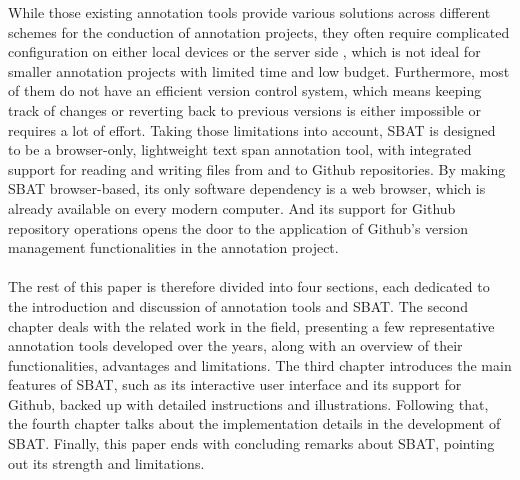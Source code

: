 \documentclass[12ptm a4paper]{article}
\begin{document}
While those existing annotation tools provide various solutions across different schemes for the conduction of annotation projects, they often require complicated configuration on either local devices or the server side \citep{yang2018yeddalightweightcollaborativetext}, which is not ideal for smaller annotation projects with limited time and low budget. Furthermore, most of them do not have an efficient version control system, which means keeping track of changes or reverting back to previous versions is either impossible or requires a lot of effort. Taking those limitations into account, SBAT is designed to be a browser-only, lightweight text span annotation tool, with integrated support for reading and writing files from and to Github repositories. By making SBAT browser-based, its only software dependency is a web browser, which is already available on every modern computer. And its support for Github repository operations opens the door to the application of Github's version management functionalities in the annotation project.\\
\\
The rest of this paper is therefore divided into four sections, each dedicated to the introduction and discussion of annotation tools and SBAT. The second chapter deals with the related work in the field, presenting a few representative annotation tools developed over the years, along with an overview of their functionalities, advantages and limitations. The third chapter introduces the main features of SBAT, such as its interactive user interface and its support for Github, backed up with detailed instructions and illustrations. Following that, the fourth chapter talks about the implementation details in the development of SBAT. Finally, this paper ends with concluding remarks about SBAT, pointing out its strength and limitations.


\newpage
\end{document}
